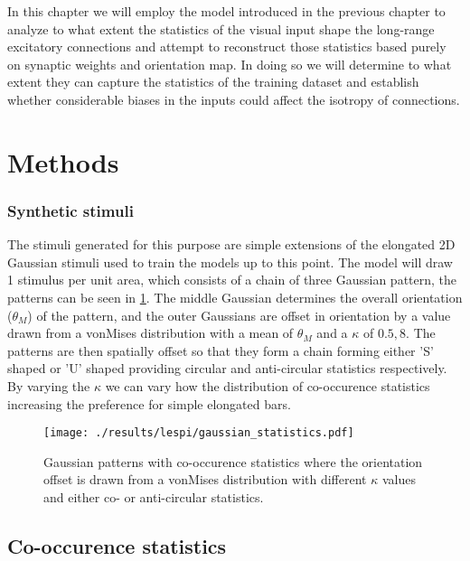 In this chapter we will employ the model introduced in the previous
chapter to analyze to what extent the statistics of the visual input
shape the long-range excitatory connections and attempt to reconstruct
those statistics based purely on synaptic weights and orientation
map. In doing so we will determine to what extent they can capture the
statistics of the training dataset and establish whether considerable
biases in the inputs could affect the isotropy of connections.

\section{Methods}

\subsubsection{Synthetic stimuli} \label{synthetic}

The stimuli generated for this purpose are simple extensions of the
elongated 2D Gaussian stimuli used to train the models up to this
point. The model will draw 1 stimulus per unit area, which consists of
a chain of three Gaussian pattern, the patterns can be seen in
\ref{GaussianStatistics}. The middle Gaussian determines the overall
orientation ($\theta_M$) of the pattern, and the outer Gaussians are
offset in orientation by a value drawn from a vonMises distribution
with a mean of $\theta_M$ and a $\kappa$ of ${0.5, 8}$. The patterns
are then spatially offset so that they form a chain forming either 'S'
shaped or 'U' shaped providing circular and anti-circular statistics
respectively. By varying the $\kappa$ we can vary how the distribution
of co-occurence statistics increasing the preference for simple
elongated bars.

\begin{figure}
	\centering
	\texttt{[image: ./results/lespi/gaussian\_statistics.pdf]}
	\caption[Example of Gaussian patterns with co-occurence
      statistics] {Gaussian patterns with co-occurence statistics
      where the orientation offset is drawn from a vonMises
      distribution with different $\kappa$ values and either co- or
      anti-circular statistics.}
    \label{GaussianStatistics}
\end{figure}

\subsection{Co-occurence statistics}

